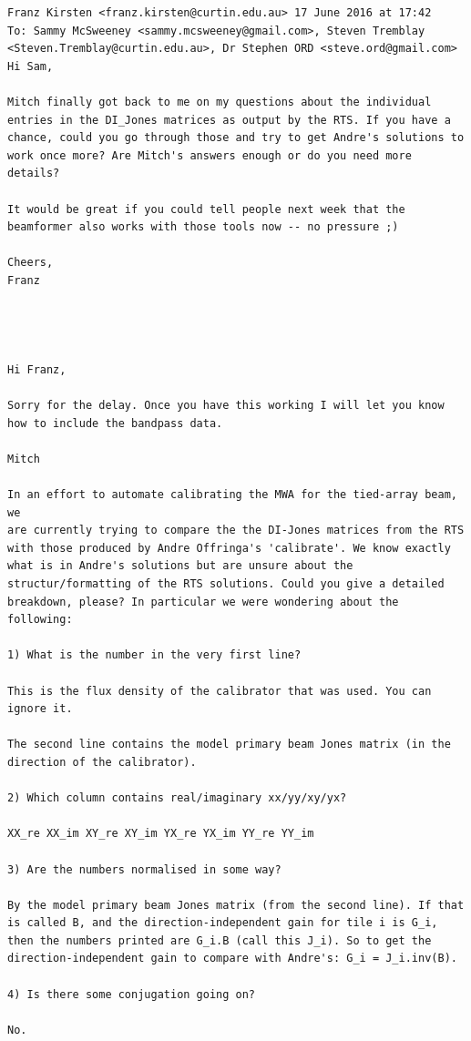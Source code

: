 \documentclass{book}
\begin{document}
\begin{lstlisting}
Franz Kirsten <franz.kirsten@curtin.edu.au>	17 June 2016 at 17:42
To: Sammy McSweeney <sammy.mcsweeney@gmail.com>, Steven Tremblay <Steven.Tremblay@curtin.edu.au>, Dr Stephen ORD <steve.ord@gmail.com>
Hi Sam,

Mitch finally got back to me on my questions about the individual entries in the DI_Jones matrices as output by the RTS. If you have a chance, could you go through those and try to get Andre's solutions to work once more? Are Mitch's answers enough or do you need more details?

It would be great if you could tell people next week that the beamformer also works with those tools now -- no pressure ;)

Cheers,
Franz




Hi Franz,

Sorry for the delay. Once you have this working I will let you know how to include the bandpass data.

Mitch

In an effort to automate calibrating the MWA for the tied-array beam, we
are currently trying to compare the the DI-Jones matrices from the RTS
with those produced by Andre Offringa's 'calibrate'. We know exactly
what is in Andre's solutions but are unsure about the
structur/formatting of the RTS solutions. Could you give a detailed
breakdown, please? In particular we were wondering about the following:

1) What is the number in the very first line?

This is the flux density of the calibrator that was used. You can ignore it.

The second line contains the model primary beam Jones matrix (in the direction of the calibrator).

2) Which column contains real/imaginary xx/yy/xy/yx?

XX_re XX_im XY_re XY_im YX_re YX_im YY_re YY_im

3) Are the numbers normalised in some way?

By the model primary beam Jones matrix (from the second line). If that is called B, and the direction-independent gain for tile i is G_i, then the numbers printed are G_i.B (call this J_i). So to get the direction-independent gain to compare with Andre's: G_i = J_i.inv(B).

4) Is there some conjugation going on?

No.
\end{lstlisting}
\end{document}
